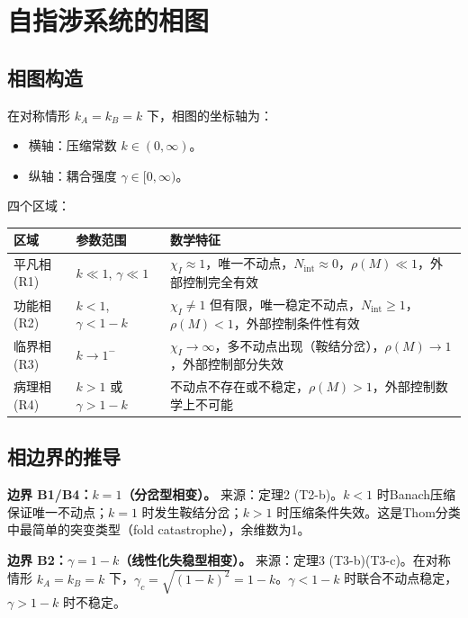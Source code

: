 \documentclass[12pt,a4paper]{article}
\theoremstyle{definition}
\newcommand{\chiI}{\chi_I}
\newcommand{\Nint}{N_{\mathrm{int}}}
\newcommand{\gamc}{\gamma_c}
\begin{document}
\section{自指涉系统的相图}
\label{sec:phase}

\subsection{相图构造}

在对称情形 $k_A = k_B = k$ 下，相图的坐标轴为：
\begin{itemize}[leftmargin=*]
\item 横轴：压缩常数 $k \in (0, \infty)$。
\item 纵轴：耦合强度 $\gamma \in [0, \infty)$。
\end{itemize}

四个区域：

\begin{longtable}{p{} p{} p{}}
\toprule
区域 & 参数范围 & 数学特征 \\
\midrule
平凡相 (R1) & $k \ll 1$, $\gamma \ll 1$ & $\chiI \approx 1$，唯一不动点，$\Nint \approx 0$，$\rho(M) \ll 1$，外部控制完全有效 \\
功能相 (R2) & $k < 1$, $\gamma < 1-k$ & $\chiI \neq 1$ 但有限，唯一稳定不动点，$\Nint \geq 1$，$\rho(M) < 1$，外部控制条件性有效 \\
临界相 (R3) & $k \to 1^-$ & $\chiI \to \infty$，多不动点出现（鞍结分岔），$\rho(M) \to 1$，外部控制部分失效 \\
病理相 (R4) & $k > 1$ 或 $\gamma > 1-k$ & 不动点不存在或不稳定，$\rho(M) > 1$，外部控制数学上不可能 \\
\bottomrule
\end{longtable}

\subsection{相边界的推导}

\textbf{边界 B1/B4：$k = 1$（分岔型相变）。}
来源：定理2 (T2-b)。$k < 1$ 时Banach压缩保证唯一不动点；$k = 1$ 时发生鞍结分岔；$k > 1$ 时压缩条件失效。这是Thom分类中最简单的突变类型（fold catastrophe），余维数为1。

\textbf{边界 B2：$\gamma = 1 - k$（线性化失稳型相变）。}
来源：定理3 (T3-b)(T3-c)。在对称情形 $k_A = k_B = k$ 下，$\gamc = \sqrt{(1-k)^2} = 1 - k$。$\gamma < 1-k$ 时联合不动点稳定，$\gamma > 1-k$ 时不稳定。
\end{document}
